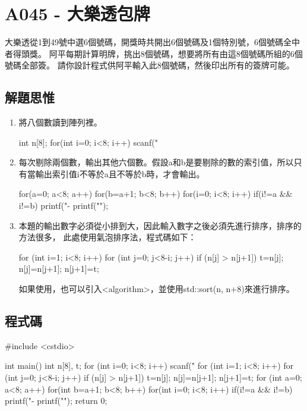 \section{A045 - 大樂透包牌}
大樂透從1到49號中選6個號碼，開獎時共開出6個號碼及1個特別號，6個號碼全中者得頭獎。
阿平每期計算明牌，挑出8個號碼，想要將所有由這8個號碼所組的6個號碼全部簽。
請你設計程式供阿平輸入此8個號碼，然後印出所有的簽牌可能。

\subsection{解題思惟}

\begin{enumerate}
\item 將八個數讀到陣列裡。
	\begin{inside}
	int n[8];
	for(int i=0; i<8; i++) {
		scanf("%
	}
	\end{inside}
\item 每次剔除兩個數，輸出其他六個數。假設a和b是要剔除的數的索引值，所以只有當輸出索引值i不等於a且不等於b時，才會輸出。
	\begin{inside}
	for(a=0; a<8; a++) {
		for(b=a+1; b<8; b++) {
			for(i=0; i<8; i++) {
				if(i!=a && i!=b) printf("-%
			}
		printf("\n");
		}
	}
	\end{inside}
\item 本題的輸出數字必須從小排到大，因此輸入數字之後必須先進行排序，排序的方法很多，
此處使用氣泡排序法，程式碼如下：
\begin{inside}
	for (int i=1; i<8; i++) for (int j=0; j<8-i; j++) {
		if (n[j] > n[j+1]) { t=n[j]; n[j]=n[j+1]; n[j+1]=t; }
	}
\end{inside}
如果使用\cc{}，也可以引入<algorithm>，並使用std::sort(n, n+8)來進行排序。
\end{enumerate}

\subsection{程式碼}
\begin{cppcode}
#include <cstdio>

int main()
{
	int n[8], t;
	for (int i=0; i<8; i++) scanf("%
	for (int i=1; i<8; i++) for (int j=0; j<8-i; j++) {
		if (n[j] > n[j+1]) { t=n[j]; n[j]=n[j+1]; n[j+1]=t; }
	}
	for (int a=0; a<8; a++) {
		for(int b=a+1; b<8; b++) {
			for(int i=0; i<8; i++) {
				if(i!=a && i!=b) printf("-%
			}
			printf("\n");
		}
	}
	return 0;
}
\end{cppcode}
